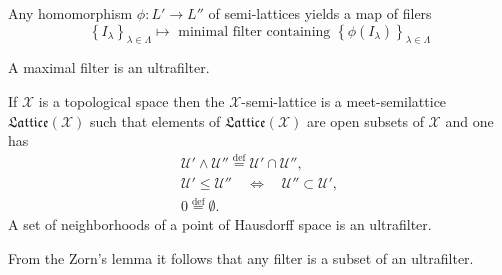 \documentclass{beamer}
\theoremstyle{plain}
\newcommand{\be}{\begin{equation}}
\newcommand{\ee}{\end{equation}}
\newcommand{\sU}{\mathcal{U}}       %
\newcommand{\sX}{\mathcal{X}}       %
\newcommand{\la}{\lambda}
\newcommand{\La}{\Lambda}
\newcommand{\bydef}{\stackrel{\mathrm{def}}{=}}
\begin{document}
\begin{frame}
		Any homomorphism $\phi : L' \to L''$ of {semi}-{lattices} yields a map
		of filers
		\be\label{filtermap_eqn}
		\left\{I_\la\right\}_{\la \in \La}	\mapsto \text{ minimal filter containing } \left\{\phi\left( I_\la\right) \right\}_{\la \in \La}
		\ee
\begin{definition}\label{ultra_filter_defn}
	A maximal filter is an \alert{ultrafilter}.
\end{definition}		
		\begin{example}\label{space_semi_exm}
			If $\sX$ is a topological space then the $\sX$-\alert{semi}-\alert{lattice} is  a  meet-semilattice $\mathfrak{Lattice}\left( \sX\right)$ such that elements of $\mathfrak{Lattice}\left( \sX\right)$ are open subsets of $\sX$ and one has
			\be\label{x_lat_eqn}
			\begin{split}
				\sU' \wedge \sU''\bydef \sU' \cap \sU'',\\
				\sU' \le \sU'' \quad \Leftrightarrow\quad \sU'' \subset \sU',\\
				0 \bydef \emptyset.
			\end{split}
			\ee
			A set of neighborhoods of a point of Hausdorff space is an ultrafilter.
		\end{example}
	\label{ultra_filter_rem}
			From the Zorn’s lemma it follows that any filter is a subset of an	ultrafilter.

		
	\end{frame}
\end{document}
